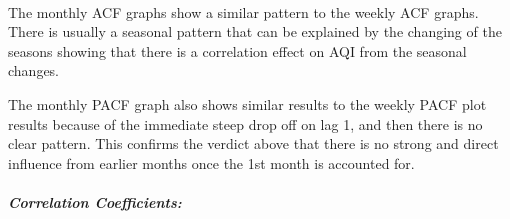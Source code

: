 \documentclass[11pt, twocolumn]{article}
\begin{document}
    \begin{center}
    \end{center}
    { \hspace*{\fill} \\}
    
    The monthly ACF graphs show a similar pattern to the weekly ACF graphs.
There is usually a seasonal pattern that can be explained by the
changing of the seasons showing that there is a correlation effect on
AQI from the seasonal changes.

The monthly PACF graph also shows similar results to the weekly PACF
plot results because of the immediate steep drop off on lag 1, and then
there is no clear pattern. This confirms the verdict above that there is
no strong and direct influence from earlier months once the 1st month is
accounted for.

    \subparagraph{Correlation Coefficients:}\label{correlation-coefficients}

    \begin{center}
    \end{center}
    { \hspace*{\fill} \\}
    
    \begin{center}
    \end{center}
    { \hspace*{\fill} \\}
    
    \begin{center}
    \end{center}
    { \hspace*{\fill} \\}
    
    \begin{center}
    \end{center}
    { \hspace*{\fill} \\}
    
\end{document}
